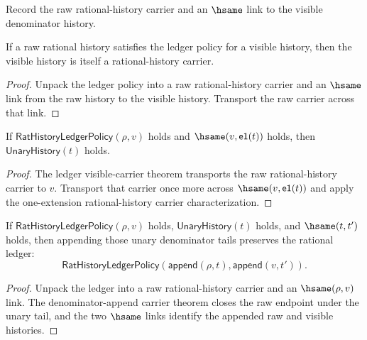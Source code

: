\begin{definition}
\label{def:rat-ledger-policy}
Record the raw rational-history carrier and an $\hsame$ link to the visible denominator history.
\end{definition}

\begin{theorem}
\label{thm:rat-ledger-visible-carrier}
If a raw rational history satisfies the ledger policy for a visible history, then the visible history is itself a rational-history carrier.
\end{theorem}
\begin{proof}
Unpack the ledger policy into a raw rational-history carrier and an $\hsame$ link from the raw history to the visible history. Transport the raw carrier across that link.
\end{proof}

\begin{theorem}
\label{thm:rat-ledger-visible-positive-denominator-readback}
If $\mathsf{RatHistoryLedgerPolicy}(\rho,v)$ holds and
$\hsame(v,\mathsf{e1}(t))$ holds, then $\mathsf{UnaryHistory}(t)$ holds.
\end{theorem}
\begin{proof}
The ledger visible-carrier theorem transports the raw rational-history carrier
to $v$. Transport that carrier once more across $\hsame(v,\mathsf{e1}(t))$ and
apply the one-extension rational-history carrier characterization.
\end{proof}

\begin{theorem}
\label{thm:rat-ledger-append-unary-denominator-closed}
If $\mathsf{RatHistoryLedgerPolicy}(\rho,v)$ holds, $\mathsf{UnaryHistory}(t)$
holds, and $\hsame(t,t')$ holds, then appending those unary denominator tails
preserves the rational ledger:
$$
\mathsf{RatHistoryLedgerPolicy}(\mathsf{append}(\rho,t),\mathsf{append}(v,t')).
$$
\end{theorem}
\begin{proof}
Unpack the ledger into a raw rational-history carrier and an $\hsame(\rho,v)$
link. The denominator-append carrier theorem closes the raw endpoint under the
unary tail, and the two $\hsame$ links identify the appended raw and visible
histories.
\end{proof}

